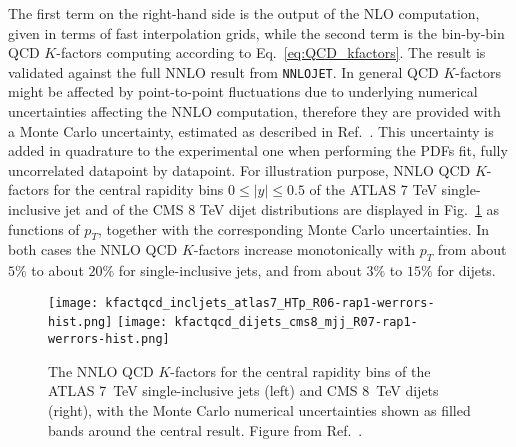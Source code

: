 The first term on the right-hand side is the output of the NLO computation, given in terms of fast interpolation grids,
while the second term is the bin-by-bin QCD $K$-factors computing according to Eq.~\eqref{eq:QCD_kfactors}. 
The result is validated against the full NNLO result from {\tt NNLOJET}. In general QCD $K$-factors might be affected by 
point-to-point fluctuations due to underlying numerical uncertainties affecting the NNLO computation,
therefore they are provided with a Monte Carlo uncertainty, estimated as described in Ref.~\cite{Ridder:2016rzm}.
This uncertainty is added in quadrature to the experimental one when performing the PDFs fit, fully uncorrelated datapoint 
by datapoint.
For illustration purpose, NNLO QCD $K$-factors for the central rapidity bins $0\leq |y| \leq 0.5$
of the ATLAS 7 TeV single-inclusive jet and of the CMS 8 TeV dijet distributions are displayed 
in Fig.~\ref{fig:kfactqcd_werrors} as functions of $p_T$, together with the corresponding Monte Carlo uncertainties.
In both cases the NNLO QCD $K$-factors increase monotonically with $p_T$ from about $5\%$ to about $20\%$ for single-inclusive
jets, and from about $3\%$ to $15\%$ for dijets. 
\begin{figure}[!t]
    \centering
    \texttt{[image: kfactqcd\_incljets\_atlas7\_HTp\_R06-rap1-werrors-hist.png]}
    \texttt{[image: kfactqcd\_dijets\_cms8\_mjj\_R07-rap1-werrors-hist.png]}
    \caption{The NNLO QCD $K$-factors for the central rapidity bins of the ATLAS 
       7~TeV single-inclusive jets (left) and CMS 8~TeV dijets (right), with
       the Monte Carlo numerical uncertainties shown as filled bands around the 
       central result. Figure from Ref.~\cite{AbdulKhalek:2020jut}.}
\label{fig:kfactqcd_werrors} 
\end{figure}

